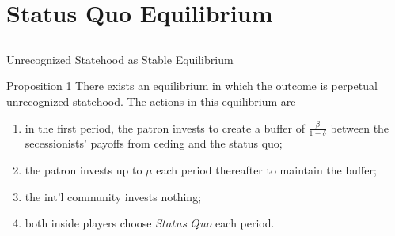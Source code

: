 \documentclass[handout]{beamer}
\begin{document}


\section{Status Quo Equilibrium}
\subsection{}


\begin{frame}{Unrecognized Statehood as Stable Equilibrium}
\begin{beamerboxesrounded}[upper=palette tertiary, shadow=true]{Proposition 1}
  There exists an equilibrium in which the outcome is perpetual unrecognized statehood. The actions in this equilibrium are 
	\begin{enumerate}
		\item in the first period, the patron invests to create a buffer of $\frac{\beta}{1-\delta}$ between the secessionists' payoffs from ceding and the status quo;
		\item the patron invests up to $\mu$ each period thereafter to maintain the buffer;
		\item the int'l community invests nothing;
		\item both inside players choose $Status$ $Quo$ each period.
	\end{enumerate}
	
\end{beamerboxesrounded}
\end{frame}
\end{document}
